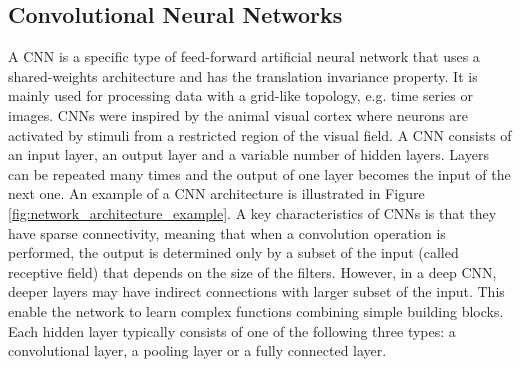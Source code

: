\subsection{Convolutional Neural Networks}
A \acl{CNN} is a specific type of feed-forward artificial neural network that uses a shared-weights architecture and has the translation invariance property. It is mainly used for processing data with a grid-like topology, e.g. time series or images. \acsp{CNN} were inspired by the animal visual cortex where neurons are activated by stimuli from a restricted region of the visual field. A \acs{CNN} consists of an input layer, an output layer and a variable number of hidden layers. Layers can be repeated many times and the output of one layer becomes the input of the next one. An example of a \acs{CNN} architecture is illustrated in Figure \ref{fig:network_architecture_example}.
A key characteristics of \acsp{CNN} is that they have sparse connectivity, meaning that when a convolution operation is performed, the output is determined only by a subset of the input (called receptive field) that depends on the size of the filters. However, in a deep \acs{CNN}, deeper layers may have indirect connections with larger subset of the input. This enable the network to learn complex functions combining simple building blocks. Each hidden layer typically consists of one of the following three types: a convolutional layer, a pooling layer or a fully connected layer. \\

